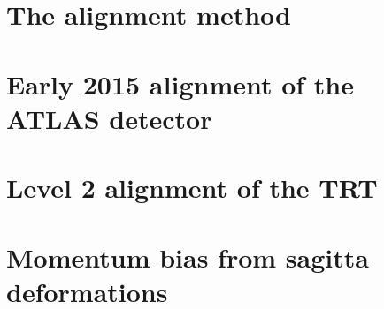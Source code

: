 \section{The alignment method}\label{align:method}


\section{Early 2015 alignment of the ATLAS detector}\label{align:2015}


\section{Level 2 alignment of the TRT}\label{align:trt}


%

\section{Momentum bias from sagitta deformations}\label{align:bias}


%
